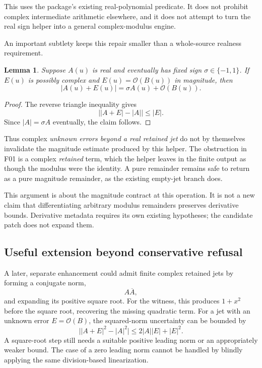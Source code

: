 \documentclass[11pt,letterpaper]{article}
\newcommand{\Oterm}{\mathcal{O}}
\newtheorem{lemma}[proposition]{Lemma}
\begin{document}
This uses the package's existing real-polynomial predicate. It does not prohibit complex intermediate arithmetic elsewhere, and it does not attempt to turn the real sign helper into a general complex-modulus engine.

An important subtlety keeps this repair smaller than a whole-source realness requirement.

\begin{lemma}\label{lem:lipschitz}
Suppose $A(u)$ is real and eventually has fixed sign $\sigma\in\{-1,1\}$. If $E(u)$ is possibly complex and $E(u)=\Oterm(B(u))$ in magnitude, then
\[
 |A(u)+E(u)|=\sigma A(u)+\Oterm(B(u)).
\]
\end{lemma}
\begin{proof}
The reverse triangle inequality gives
\[
 \bigl||A+E|-|A|\bigr|\leq |E|.
\]
Since $|A|=\sigma A$ eventually, the claim follows.
\end{proof}

Thus complex \emph{unknown errors beyond a real retained jet} do not by themselves invalidate the magnitude estimate produced by this helper. The obstruction in F01 is a complex \emph{retained} term, which the helper leaves in the finite output as though the modulus were the identity. A pure remainder remains safe to return as a pure magnitude remainder, as the existing empty-jet branch does.

This argument is about the magnitude contract at this operation. It is not a new claim that differentiating arbitrary modulus remainders preserves derivative bounds. Derivative metadata requires its own existing hypotheses; the candidate patch does not expand them.

\subsection{Useful extension beyond conservative refusal}

A later, separate enhancement could admit finite complex retained jets by forming a conjugate norm,
\[
 A\overline A,
\]
and expanding its positive square root. For the witness, this produces $1+x^2$ before the square root, recovering the missing quadratic term. For a jet with an unknown error $E=\Oterm(B)$, the squared-norm uncertainty can be bounded by
\[
 \bigl||A+E|^2-|A|^2\bigr|
 \leq 2|A||E|+|E|^2.
\]
A square-root step still needs a suitable positive leading norm or an appropriately weaker bound. The case of a zero leading norm cannot be handled by blindly applying the same division-based linearization.
\end{document}

